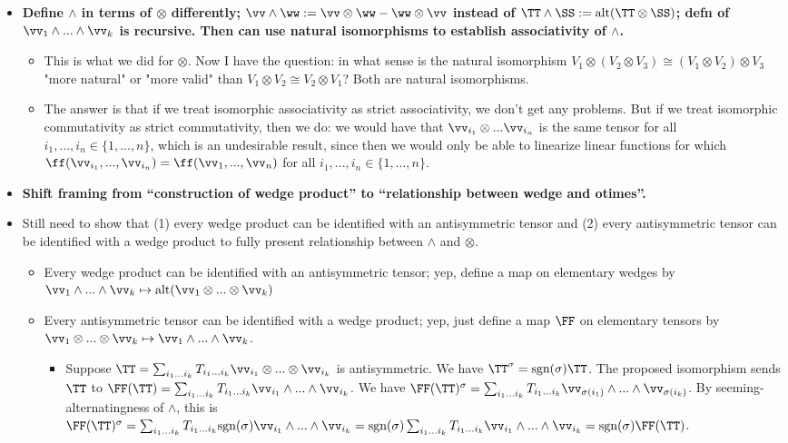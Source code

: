 \begin{itemize}
    \item \textbf{Define $\wedge$ in terms of $\otimes$ differently; $\vv \wedge \ww := \vv \otimes \ww - \ww \otimes \vv$ instead of $\TT \wedge \SS := \alt(\TT \otimes \SS)$; defn of $\vv_1 \wedge ... \wedge \vv_k$ is recursive. Then can use natural isomorphisms to establish associativity of $\wedge$.}
    \begin{itemize}
        \item This is what we did for $\otimes$. Now I have the question: in what sense is the natural isomorphism $V_1 \otimes (V_2 \otimes V_3) \cong (V_1 \otimes V_2) \otimes V_3$ "more natural" or "more valid" than $V_1 \otimes V_2 \cong V_2 \otimes V_1$? Both are natural isomorphisms.
        \item The answer is that if we treat isomorphic associativity as strict associativity, we don't get any problems. But if we treat isomorphic commutativity as strict commutativity, then we do: we would have that $\vv_{i_1} \otimes ... \vv_{i_n}$ is the same tensor for all $i_1, ..., i_n \in \{1, ..., n\}$, which is an undesirable result, since then we would only be able to linearize linear functions for which $\ff(\vv_{i_1}, ..., \vv_{i_n}) = \ff(\vv_1, ..., \vv_n)$ for all $i_1, ..., i_n \in \{1, ..., n\}$. 
    \end{itemize}
    \item \textbf{Shift framing from “construction of wedge product” to “relationship between wedge and otimes”.}
    \item Still need to show that (1) every wedge product can be identified with an antisymmetric tensor and (2) every antisymmetric tensor can be identified with a wedge product to fully present relationship between $\wedge$ and $\otimes$.
    \begin{itemize}
        \item Every wedge product can be identified with an antisymmetric tensor; yep, define a map on elementary wedges by $\vv_1 \wedge ... \wedge \vv_k \mapsto \alt(\vv_1 \otimes ... \otimes \vv_k)$
        \item Every antisymmetric tensor can be identified with a wedge product; yep, just define a map $\FF$ on elementary tensors by $\vv_1 \otimes ... \otimes \vv_k \mapsto \vv_1 \wedge ... \wedge \vv_k$.
        \begin{itemize}
            \item Suppose $\TT = \sum_{i_1 ... i_k} T_{i_1 ... i_k} \vv_{i_1} \otimes ... \otimes \vv_{i_k}$ is antisymmetric. We have $\TT^\sigma = \sgn(\sigma)\TT$. The proposed isomorphism sends $\TT$ to $\FF(\TT) = \sum_{i_1 ... i_k} T_{i_1 ... i_k} \vv_{i_1} \wedge ... \wedge \vv_{i_k}$. We have $\FF(\TT)^\sigma = \sum_{i_1 ... i_k} T_{i_1 ... i_k} \vv_{\sigma(i_1)} \wedge ... \wedge \vv_{\sigma(i_k)}$. By seeming-alternatingness of $\wedge$, this is $\FF(\TT)^\sigma = \sum_{i_1 ... i_k} T_{i_1 ... i_k} \sgn(\sigma) \vv_{i_1} \wedge ... \wedge \vv_{i_k} = \sgn(\sigma) \sum_{i_1 ... i_k} T_{i_1 ... i_k} \vv_{i_1} \wedge ... \wedge \vv_{i_k} = \sgn(\sigma) \FF(\TT)$.


\end{itemize}
\end{itemize}
\end{itemize}
